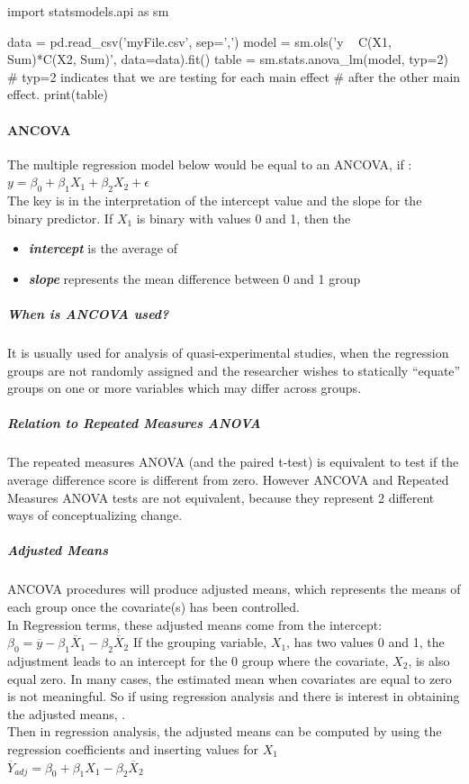 \begin{python}
import statsmodels.api as sm

data = pd.read_csv('myFile.csv', sep=',')
model = sm.ols('y ~ C(X1, Sum)*C(X2, Sum)', data=data).fit()
table = sm.stats.anova_lm(model, typ=2) # typ=2 indicates that we are testing for each main effect
# after the other main effect.
print(table)
\end{python}

\paragraph{ANCOVA} The multiple regression model below would be equal to an ANCOVA, if :$y = \beta_{0}+\beta_{1}X_{1}+\beta_{2}X_{2}+\epsilon$\\ The key is in the interpretation of the intercept value and the slope for the binary predictor.  If $X_{1}$ is binary with values 0 and 1, then the \begin{itemize} \item \textbf{\emph{intercept}} is the average of  \item \textbf{\emph{slope}} represents the mean difference between 0 and 1 group\\ 
\end{itemize}

\subparagraph{When is ANCOVA used?}
It is usually used for analysis of quasi-experimental studies, when the regression groups are
not randomly assigned and the researcher wishes to statically ``equate'' groups on one or more
variables which may differ across groups. 
\subparagraph{Relation to Repeated Measures ANOVA}
The repeated measures ANOVA (and the paired t-test) is equivalent to test if the average 
difference score is different from zero. However ANCOVA and Repeated Measures ANOVA tests are not
equivalent, because they represent 2 different ways of conceptualizing change.
\subparagraph{Adjusted Means} 
ANCOVA procedures will produce adjusted means, which represents the means of each group once the
covariate(s) has been controlled.\\ In Regression terms, these adjusted means come from the 
intercept: $\beta_{0}=\overline{y}-\beta_{1}\overline{X}_{1}-\beta_{2}\overline{X}_{2}$
 If the grouping variable, $X_{1}$, has two
values 0 and 1, the adjustment leads to an intercept for the 0 group where the covariate, $X_{2}$,
is also equal zero. In many cases, the estimated mean when covariates are equal to zero is not
meaningful. So if using regression analysis and there is interest in obtaining the adjusted means,
.\\
Then in regression analysis, the adjusted means can be computed by using the regression 
coefficients and inserting values for $X_{1}$\\ $\overline{Y}_{adj}=\beta_{0}+\beta_{1}X_{1}-\beta_{2}\overline{X}_{2}$

